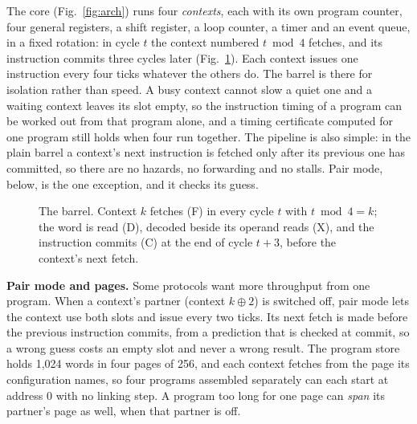 \documentclass[conference,letterpaper]{IEEEtran}
\begin{document}
The core (Fig.~\ref{fig:arch}) runs four \emph{contexts}, each with its own program
counter, four general registers, a shift register, a loop counter, a timer and an event
queue, in a fixed rotation: in cycle $t$ the context numbered $t \bmod 4$ fetches, and its
instruction commits three cycles later (Fig.~\ref{fig:barrel}). Each context issues one
instruction every four ticks whatever the others do. The barrel is there for isolation
rather than speed. A busy context cannot slow a quiet one and a waiting context leaves
its slot empty, so the instruction timing of a program can be worked out from that
program alone, and a timing certificate computed for one program still holds when four
run together. The pipeline is also simple: in the plain barrel a context's next instruction is
fetched only after its previous one has committed, so there are no hazards, no forwarding
and no stalls. Pair mode, below, is the one exception, and it checks its guess.

\begin{figure}[t]
\centering
{}
\caption{The barrel. Context $k$ fetches (F) in every cycle $t$ with $t \bmod 4 = k$; the
word is read (D), decoded beside its operand reads (X), and the instruction commits (C) at
the end of cycle $t+3$, before the context's next fetch.}
\label{fig:barrel}
\end{figure}

\textbf{Pair mode and pages.} Some protocols want more throughput from one program. When
a context's partner (context $k \oplus 2$) is switched off, pair mode lets the context
use both slots and issue every two ticks. Its next fetch is made before the previous
instruction commits, from a prediction that is checked at commit, so a wrong guess costs
an empty slot and never a wrong result. The program store holds 1{,}024 words in four
pages of 256, and each context fetches from the page its configuration names, so four
programs assembled separately can each start at address 0 with no linking step. A program
too long for one page can \emph{span} its partner's page as well, when that partner is off.
\end{document}

